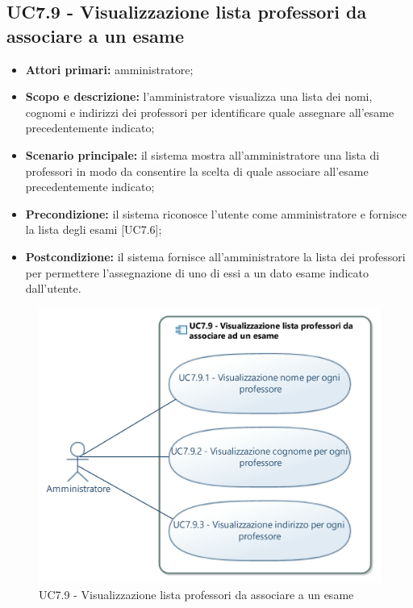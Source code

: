 \documentclass[AnalisiDeiRequisiti.tex]{subfiles}
\begin{document}
\subsection{UC7.9 - Visualizzazione lista professori da associare a un esame}
\begin{itemize}
	\item \textbf{Attori primari:} amministratore;
	\item \textbf{Scopo e descrizione:} l'amministratore visualizza una lista dei nomi, cognomi e indirizzi dei professori per identificare quale assegnare all'esame precedentemente indicato;
	\item \textbf{Scenario principale:} il sistema mostra all'amministratore una lista di professori in modo da consentire la scelta di quale associare all'esame precedentemente indicato;
	\item \textbf{Precondizione:} il sistema riconosce l'utente come amministratore e fornisce la lista degli esami [UC7.6];  
	\item \textbf{Postcondizione:} il sistema fornisce all'amministratore la lista dei professori per permettere l'assegnazione di uno di essi a un dato esame indicato dall'utente.
\end{itemize}
\begin{figure}[H]
	\centering
	\includegraphics[width=0.7\linewidth]{UC7_9.jpg}
	\caption{UC7.9 - Visualizzazione lista professori da associare a un esame}
	\label{UC7.9 - Visualizzazione lista professori da associare a un esame}
\end{figure}
\end{document}
